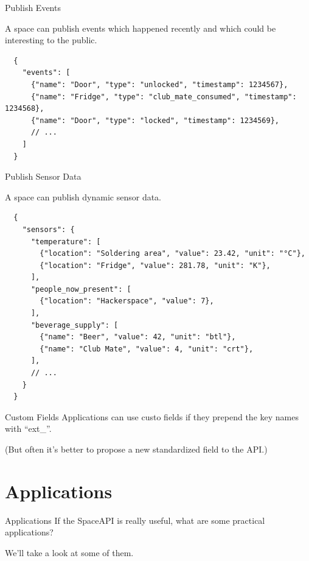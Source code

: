 \begin{frame}[fragile]{Publish Events}

A space can publish events which happened recently and which could be
interesting to the public.

	\begin{verbatim}
  {
    "events": [
      {"name": "Door", "type": "unlocked", "timestamp": 1234567},
      {"name": "Fridge", "type": "club_mate_consumed", "timestamp": 1234568},
      {"name": "Door", "type": "locked", "timestamp": 1234569},
      // ...
    ]
  }
	\end{verbatim}
\end{frame}

\begin{frame}[fragile]{Publish Sensor Data}

A space can publish dynamic sensor data.

	\begin{verbatim}
  {
    "sensors": {
      "temperature": [
        {"location": "Soldering area", "value": 23.42, "unit": "°C"},
        {"location": "Fridge", "value": 281.78, "unit": "K"},
      ],
      "people_now_present": [
        {"location": "Hackerspace", "value": 7},
      ],
      "beverage_supply": [
        {"name": "Beer", "value": 42, "unit": "btl"},
        {"name": "Club Mate", "value": 4, "unit": "crt"},
      ],
      // ...
    }
  }
	\end{verbatim}
\end{frame}

\begin{frame}[fragile]{Custom Fields}
	Applications can use custo fields if they prepend the key names with ``ext\_''.

	(But often it's better to propose a new standardized field to the API.)
\end{frame}


\section{Applications}

\begin{frame}{Applications}
	If the SpaceAPI is really useful, what are some practical applications?

	We'll take a look at some of them.
\end{frame}

